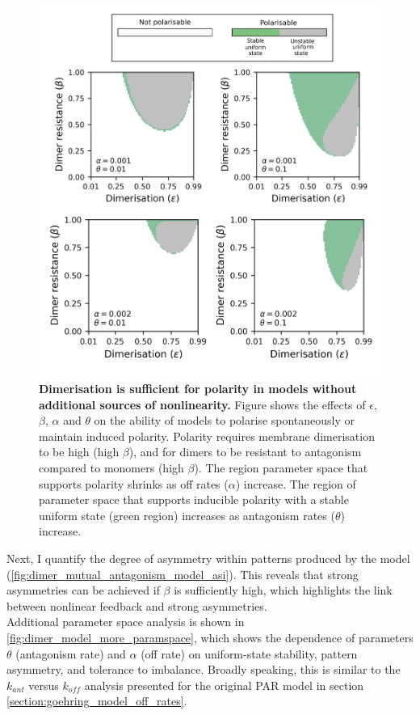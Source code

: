 \documentclass[12pt]{"report"}
\newcommand{\mycaption}[2]{\caption[#1]{\textbf{#1.} #2}}
\begin{document}
\begin{figure}
\includegraphics[scale=1]{dimer_model_triggering}
\centering
\mycaption{Dimerisation is sufficient for polarity in models without additional sources of nonlinearity}{
Figure shows the effects of $\epsilon$, $\beta$, $\alpha$ and $\theta$ on the ability of models to polarise spontaneously or maintain induced polarity. Polarity requires membrane dimerisation to be high (high $\beta$), and for dimers to be resistant to antagonism compared to monomers (high $\beta$). The region parameter space that supports polarity shrinks as off rates ($\alpha$) increase. The region of parameter space that supports inducible polarity with a stable uniform state (green region) increases as antagonism rates ($\theta$) increase.
}
\label{fig:dimer_model_triggering}
\end{figure}

Next, I quantify the degree of asymmetry within patterns produced by the model (\cref{fig:dimer_mutual_antagonism_model_asi}). This reveals that strong asymmetries can be achieved if $\beta$ is sufficiently high, which highlights the link between nonlinear feedback and strong asymmetries.\\

Additional parameter space analysis is shown in \cref{fig:dimer_model_more_paramspace}, which shows the dependence of parameters $\theta$ (antagonism rate) and $\alpha$ (off rate) on uniform-state stability, pattern asymmetry, and tolerance to imbalance. Broadly speaking, this is similar to the $k_{ant}$ versus $k_{off}$ analysis presented for the original PAR model in section \ref{section:goehring_model_off_rates}.\\
\end{document}
